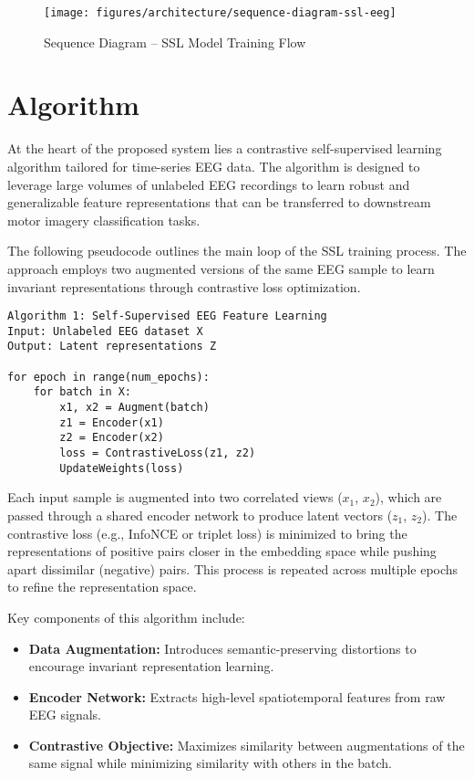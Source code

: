 \begin{figure}[h]
    \centering
    \texttt{[image: figures/architecture/sequence-diagram-ssl-eeg]}
    \caption{Sequence Diagram – SSL Model Training Flow}
    \label{fig:figure8}
\end{figure}
\newpage


\section{Algorithm}
\label{sec:algorithm}

At the heart of the proposed system lies a contrastive self-supervised learning algorithm tailored for time-series EEG data. The algorithm is designed to leverage large volumes of unlabeled EEG recordings to learn robust and generalizable feature representations that can be transferred to downstream motor imagery classification tasks.

The following pseudocode outlines the main loop of the SSL training process. The approach employs two augmented versions of the same EEG sample to learn invariant representations through contrastive loss optimization.

\begin{verbatim}
Algorithm 1: Self-Supervised EEG Feature Learning
Input: Unlabeled EEG dataset X
Output: Latent representations Z

for epoch in range(num_epochs):
    for batch in X:
        x1, x2 = Augment(batch)
        z1 = Encoder(x1)
        z2 = Encoder(x2)
        loss = ContrastiveLoss(z1, z2)
        UpdateWeights(loss)
\end{verbatim}

\noindent
Each input sample is augmented into two correlated views ($x_1$, $x_2$), which are passed through a shared encoder network to produce latent vectors ($z_1$, $z_2$). The contrastive loss (e.g., InfoNCE or triplet loss) is minimized to bring the representations of positive pairs closer in the embedding space while pushing apart dissimilar (negative) pairs. This process is repeated across multiple epochs to refine the representation space.

Key components of this algorithm include:
\begin{itemize}
    \item \textbf{Data Augmentation:} Introduces semantic-preserving distortions to encourage invariant representation learning.
    \item \textbf{Encoder Network:} Extracts high-level spatiotemporal features from raw EEG signals.
    \item \textbf{Contrastive Objective:} Maximizes similarity between augmentations of the same signal while minimizing similarity with others in the batch.
\end{itemize}


